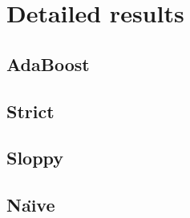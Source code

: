 

\chapter{Detailed results}
\label{appendix:allgraphs}

\section{AdaBoost}

\section{Strict}

\section{Sloppy}

\section{Na\"{\i}ve}
